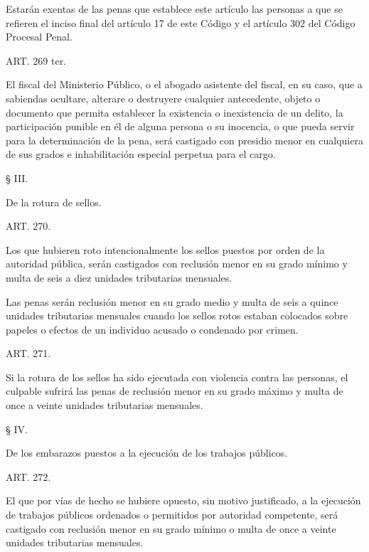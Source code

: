     Estarán exentas de las penas que establece este artículo las personas a que se refieren el inciso final del artículo 17 de este Código y el artículo 302 del Código Procesal Penal.



    ART. 269 ter.

    El fiscal del Ministerio Público, o el abogado asistente del fiscal, en su caso, que a sabiendas ocultare, alterare o destruyere cualquier antecedente, objeto o documento que permita establecer la existencia o inexistencia de un delito, la participación punible en él de alguna persona o su inocencia, o que pueda servir para la determinación de la pena, será castigado con presidio menor en cualquiera de sus grados e inhabilitación especial perpetua para el cargo.



    § III.

    De la rotura de sellos.





    ART. 270.

    Los que hubieren roto intencionalmente los sellos puestos por orden de la autoridad pública, serán castigados con reclusión menor en su grado mínimo y multa de seis a diez unidades tributarias mensuales.

    Las penas serán reclusión menor en su grado medio y multa de seis a quince unidades tributarias mensuales cuando los sellos rotos estaban colocados sobre papeles o efectos de un individuo acusado o condenado por crimen.



    ART. 271.

    Si la rotura de los sellos ha sido ejecutada con violencia contra las personas, el culpable sufrirá las penas de reclusión menor en su grado máximo y multa de once a veinte unidades tributarias mensuales.








    § IV.

    De los embarazos puestos a la ejecución de los trabajos públicos.





    ART. 272.

    El que por vías de hecho se hubiere opuesto, sin motivo justificado, a la ejecución de trabajos públicos ordenados o permitidos por autoridad competente, será castigado con reclusión menor en su grado mínimo o multa de once a veinte unidades tributarias mensuales.








